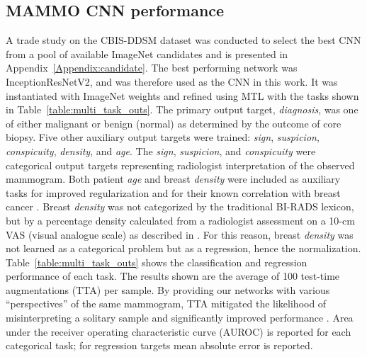 \documentclass[journal]{IEEEtran}
\begin{document}
\subsection{MAMMO CNN performance}

A trade study on the CBIS-DDSM dataset was conducted to select the best CNN from a pool of available ImageNet candidates \cite{ddsm-database1, ddsm-database2} and is presented in Appendix~\ref{Appendix:candidate}.  %
The best performing network was InceptionResNetV2, and was therefore used as the CNN in this work.  It was instantiated with ImageNet weights and refined using MTL with the tasks shown in Table~\ref{table:multi_task_outs}. The primary output target, \textit{diagnosis}, was one of either malignant or benign (normal) as determined by the outcome of core biopsy.    Five other auxiliary output targets were trained: \textit{sign}, \textit{suspicion}, \textit{conspicuity}, \textit{density}, and \textit{age}.  The \textit{sign}, \textit{suspicion}, and \textit{conspicuity} were categorical output targets representing radiologist interpretation of the observed mammogram.  Both patient \textit{age} and breast \textit{density} were included as auxiliary tasks for improved regularization and for their known correlation with breast cancer \cite{age-breastdensity, age-breastdensity2, wu-etal-2017, karssemeijer-1998, kallenberg-2016, mohamed-2018}. 
Breast \textit{density} was not categorized by the traditional BI-RADS lexicon, but by a percentage density calculated  from a radiologist assessment on a 10-cm VAS (visual analogue scale) as described in \cite{tommy-2015}. For this reason, breast \textit{density} was not learned as a categorical problem but as a regression, hence the normalization.  Table~\ref{table:multi_task_outs} shows the classification and regression performance of each task. The results shown are the average of 100 test-time augmentations (TTA) per sample.   By providing our networks with various ``perspectives'' of the same mammogram, TTA mitigated the likelihood of misinterpreting a solitary sample and significantly improved performance \cite{test-time-augmentation, test-time-augmentation2}. Area under the receiver operating characteristic curve (AUROC) is reported for each categorical task; for regression targets mean absolute error is reported.  
\end{document}
